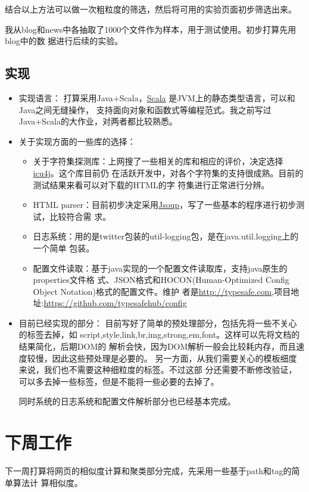 \documentclass[a4paper]{article}
\begin{document}
结合以上方法可以做一次粗粒度的筛选，然后将可用的实验页面初步筛选出来。

我从blog和news中各抽取了1000个文件作为样本，用于测试使用。初步打算先用blog中的数
据进行后续的实验。
\subsection{实现}
\label{sec-1-2}

\begin{itemize}
\item 实现语言：
  打算采用Java+Scala，\href{http://en.wikipedia.org/wiki/Scala_%28programming_language%29}{Scala} 是JVM上的静态类型语言，可以和Java之间无缝操作，
  支持面向对象和函数式等编程范式。我之前写过Java+Scala的大作业，对两者都比较熟悉。
\item 关于实现方面的一些库的选择：
\begin{itemize}
\item 关于字符集探测库：上网搜了一些相关的库和相应的评价，决定选择\href{http://site.icu-project.org/}{icu4j}。这个库目前仍
    在活跃开发中，对各个字符集的支持很成熟。目前的测试结果来看可以对下载的HTML的字
    符集进行正常进行分辨。
\item HTML parser：目前初步决定采用\href{http://jsoup.org}{Jsoup}，写了一些基本的程序进行初步测试，比较符合需
    求。
\item 日志系统：用的是twitter包装的util-logging包，是在java.util.logging上的一个简单
    包装。
\item 配置文件读取：基于java实现的一个配置文件读取库，支持java原生的properties文件格
    式、JSON格式和HOCON(Human-Optimized Config Object Notation)格式的配置文件。维护
    者是\href{http://typesafe.com}{http://typesafe.com},项目地址:\href{https://github.com/typesafehub/config}{https://github.com/typesafehub/config}
\end{itemize}
\item 目前已经实现的部分：
  目前写好了简单的预处理部分，包括先将一些不关心的标签去掉，如
  script,style,link,br,img,strong,em,font。这样可以先将文档的结果简化，后期DOM的
  解析会快，因为DOM解析一般会比较耗内存，而且速度较慢，因此这些预处理是必要的。
  另一方面，从我们需要关心的模板细度来说，我们也不需要这种细粒度的标签。不过这部
  分还需要不断修改验证，可以多去掉一些标签，但是不能将一些必要的去掉了。

  同时系统的日志系统和配置文件解析部分也已经基本完成。
\end{itemize}
\section{下周工作}
\label{sec-2}

下一周打算将网页的相似度计算和聚类部分完成，先采用一些基于path和tag的简单算法计
算相似度。
\end{document}
